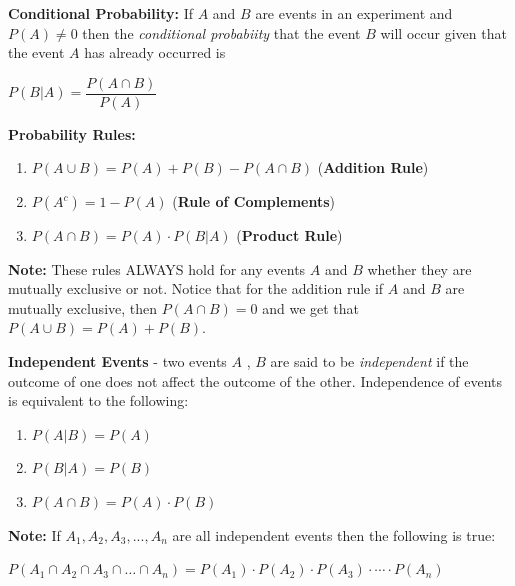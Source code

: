 \documentclass[12pt]{article}
\newenvironment{myindentpar}[1]%
     {\begin{list}{}%
             {\setlength{\leftmargin}{#1}}%
             \item[]%
     }
     {\end{list}}
\begin{document}
\vspace{.5cm}

\textbf{Conditional Probability:} If $A$ and $B$ are events in an experiment and $P(A) \neq 0$ then the \textit{conditional probabiity} that the event $B$ will occur given that the event $A$ has already occurred is 
\newline

\centerline{$P(B|A) = \dfrac{P(A \cap B)}{P(A)}$}

\textbf{Probability Rules:}

\begin{enumerate}
\item $P(A \cup B) = P(A) + P(B) - P(A \cap B)$ (\textbf{Addition Rule})
\item $P(A^{c}) = 1 - P(A)$ (\textbf{Rule of Complements})
\item $P(A \cap B) = P(A) \cdot P(B|A)$ (\textbf{Product Rule})
\end{enumerate}

\textbf{Note:} These rules ALWAYS hold for any events $A$ and $B$ whether they are mutually exclusive or not. Notice that for the addition rule if $A$ and $B$ are mutually exclusive, then $P(A \cap B) = 0$ and we get that $P(A \cup B) = P(A) + P(B)$.

\vspace{.5cm}

\textbf{Independent Events} - two events $A$ , $B$ are said to be \textit{independent} if the outcome of one does not affect the outcome of the other. Independence of events is equivalent to the following:

\begin{enumerate}
\item $P(A|B) = P(A)$
\item $P(B|A) = P(B)$
\item $P(A \cap B) = P(A) \cdot P(B)$
\end{enumerate}

\begin{myindentpar}{1cm}
\textbf{Note:} If $A_{1}, A_{2}, A_{3},...,A_{n}$ are all independent events then the following is true:
\newline

\centerline{$P(A_{1} \cap A_{2} \cap A_{3} \cap \dots \cap A_{n}) = P(A_{1}) \cdot P(A_{2}) \cdot P(A_{3}) \cdot \cdots \cdot P(A_{n})$}

\end{myindentpar}
\end{document}
